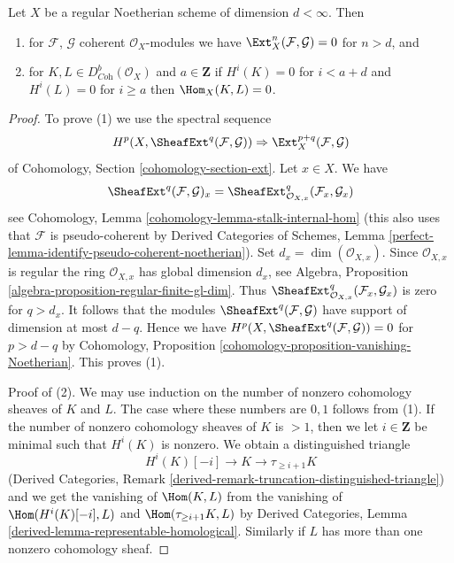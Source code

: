 \begin{lemma}
\label{lemma-Ext-0-regular}
Let $X$ be a regular Noetherian scheme of dimension $d < \infty$. Then
\begin{enumerate}
\item for $\mathcal{F}$, $\mathcal{G}$ coherent $\mathcal{O}_X$-modules
we have $\Ext^n_X(\mathcal{F}, \mathcal{G}) = 0$ for $n > d$, and
\item for $K, L \in D^b_{\textit{Coh}}(\mathcal{O}_X)$ and $a \in \mathbf{Z}$
if $H^i(K) = 0$ for $i < a + d$ and $H^i(L) = 0$ for $i \geq a$ then
$\Hom_X(K, L) = 0$.
\end{enumerate}
\end{lemma}

\begin{proof}
To prove (1) we use the spectral sequence
$$
H^p(X, \SheafExt^q(\mathcal{F}, \mathcal{G})) \Rightarrow
\Ext^{p + q}_X(\mathcal{F}, \mathcal{G})
$$
of Cohomology, Section \ref{cohomology-section-ext}. Let $x \in X$.
We have
$$
\SheafExt^q(\mathcal{F}, \mathcal{G})_x =
\SheafExt^q_{\mathcal{O}_{X, x}}(\mathcal{F}_x, \mathcal{G}_x)
$$
see Cohomology, Lemma \ref{cohomology-lemma-stalk-internal-hom}
(this also uses that $\mathcal{F}$ is pseudo-coherent by
Derived Categories of Schemes, Lemma
\ref{perfect-lemma-identify-pseudo-coherent-noetherian}).
Set $d_x = \dim(\mathcal{O}_{X, x})$.
Since $\mathcal{O}_{X, x}$ is regular the ring
$\mathcal{O}_{X, x}$ has global dimension $d_x$, see
Algebra, Proposition \ref{algebra-proposition-regular-finite-gl-dim}.
Thus $\SheafExt^q_{\mathcal{O}_{X, x}}(\mathcal{F}_x, \mathcal{G}_x)$
is zero for $q > d_x$. It follows that the modules
$\SheafExt^q(\mathcal{F}, \mathcal{G})$ have support
of dimension at most $d - q$. Hence we have
$H^p(X, \SheafExt^q(\mathcal{F}, \mathcal{G})) = 0$ for $p > d - q$
by Cohomology, Proposition \ref{cohomology-proposition-vanishing-Noetherian}.
This proves (1).

\medskip\noindent
Proof of (2).
We may use induction on the number of nonzero cohomology sheaves
of $K$ and $L$. The case where these numbers are $0, 1$ follows
from (1). If the number of nonzero cohomology sheaves of $K$
is $> 1$, then we let $i \in \mathbf{Z}$ be minimal such that
$H^i(K)$ is nonzero. We obtain a distinguished triangle
$$
H^i(K)[-i] \to K \to \tau_{\geq i + 1}K
$$
(Derived Categories, Remark
\ref{derived-remark-truncation-distinguished-triangle})
and we get the vanishing of $\Hom(K, L)$ from the vanishing
of $\Hom(H^i(K)[-i], L)$ and $\Hom(\tau_{\geq i + 1}K, L)$
by Derived Categories, Lemma \ref{derived-lemma-representable-homological}.
Similarly if $L$ has more than one nonzero cohomology sheaf.
\end{proof}

